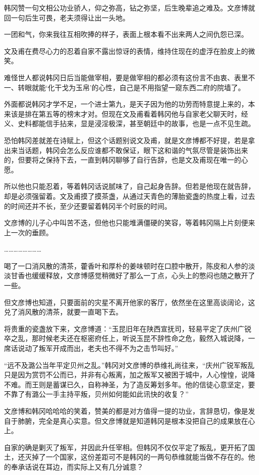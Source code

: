 韩冈赞一句文相公功业骄人，仰之弥高，钻之弥坚，后生晚辈追之难及。文彦博就回一句后生可畏，老夫须得让出一头地。

一团和气，你来我往互相吹捧的样子，表面上根本看不出来两人之间仇怨已深。

文及甫在费尽心力的忍着自家不露出惊讶的表情，维持住现在的虚浮在脸皮上的微笑。

难怪世人都说韩冈日后当能做宰相，要是做宰相的都必须有这份言不由衷、表里不一、转眼就能‘化干戈为玉帛’的心性，自己是不用指望一窥东西二府的院墙了。

外面都说韩冈才学不足，一个进士第九，是天子因为他的功劳而特意提上来的，本来该是排在第五等的榜末才对。但现在文及甫看着韩冈他与自家老父聊天时，经义、史料都能信手拈来，显是浸淫极深，甚至朝廷中的故事，也是一点不见生疏。

恐怕韩冈差就差在诗赋上，但这个话题别说文及甫，就是文彦博都不好提，若是拿出来当话题，韩冈会怎么反应谁都不敢保证，眼下这和谐的气氛尽管是装饰出来的，但要将之保持下去，一直到韩冈聊够了自行告辞，也是文及甫现在唯一的心愿。

所以他也只能忍着，等着韩冈话说腻味了，自己起身告辞。但若是他现在就告辞，却是必须强留着。文及甫摸了摸茶盏，从通过天青色的薄胎瓷盏的热度上看，过去的时间还并不长，至少还要留着韩冈半个时辰的时间。

文彦博的儿子心中叫苦不迭，但他也只能堆满僵硬的笑容，等着韩冈隔上片刻便来上一次的垂顾。

……………………

喝了一口消风散的清茶，藿香叶和厚朴的姜味顿时在口腔中散开，陈皮和人参的淡淡甘香也缓缓释放，文彦博感觉稍微好了那么一丁点，心头上的憋闷也随之散开了一些。

但文彦博也知道，只要面前的灾星不离开他家的客厅，依然坐在这里高谈阔论，这兑了消风散的清茶，就要一直喝下去。

将贵重的瓷盏放下来，文彦博道：“玉昆旧年在陕西宣抚司，轻易平定了庆州广锐卒之乱，那时候老夫还在枢密府任上，听说玉昆不辞性命之危，毅然入城说降，一席话说动了叛军开成而出，老夫也不得不为之击节叫好。”

“远不及潞公当年平定贝州之乱。”韩冈对文彦博的恭维礼尚往来，“庆州广锐军叛乱只是因为赏罚不公而已，并非有心叛离，加之叛军又被困于城中，人心惶惶，说降不难。而王则是蓄谋已久，自称神圣，为了造反筹划多年。他的信徒心意坚定，要不靠了有潞公一手主持平叛，贝州如何能如此讯快的收复？”

文彦博和韩冈哈哈哈的笑着，赞美的都是对方值得一提的功业，言辞恳切，像是发自于肺腑，完全是真心实意。但文彦博就是知道韩冈是根本没把自己的成果放在心上。

自家的确是剿灭了叛军，并因此升任宰相。但韩冈不仅仅平定了叛乱，更开拓了国土，还灭掉了一个国家，这份差距可不是韩冈的一两句恭维就能当做不存在的。他的奉承话说在耳边，而实际上又有几分诚意？

